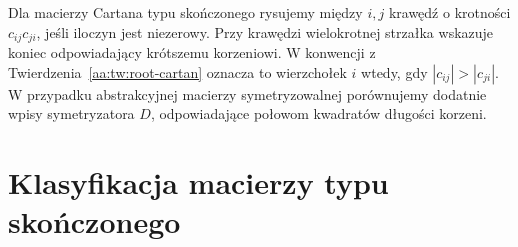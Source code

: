 \begin{definicja}
\label{aa:def:dynkin}
Dla macierzy Cartana typu skończonego rysujemy między
$i,j$ krawędź o krotności $c_{ij}c_{ji}$, jeśli
iloczyn jest niezerowy. Przy krawędzi wielokrotnej
strzałka wskazuje koniec odpowiadający krótszemu
korzeniowi. W konwencji z Twierdzenia~\ref{aa:tw:root-cartan}
oznacza to wierzchołek $i$ wtedy, gdy
$|c_{ij}|>|c_{ji}|$. W przypadku abstrakcyjnej
macierzy symetryzowalnej porównujemy dodatnie
wpisy symetryzatora $D$, odpowiadające połowom
kwadratów długości korzeni.
\end{definicja}

\section{Klasyfikacja macierzy typu skończonego}

